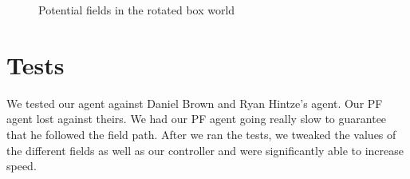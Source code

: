 \documentclass[11pt]{article}
\begin{document}
\begin{figure}[h]
	\caption{Potential fields in the rotated box world}
\end{figure}

\section{Tests}
We tested our agent against Daniel Brown and Ryan Hintze's agent.
Our PF agent lost against theirs.
We had our PF agent going really slow to guarantee that he followed the field path.
After we ran the tests, we tweaked the values of the different fields as well as our controller and were significantly able to increase speed.
\end{document}
